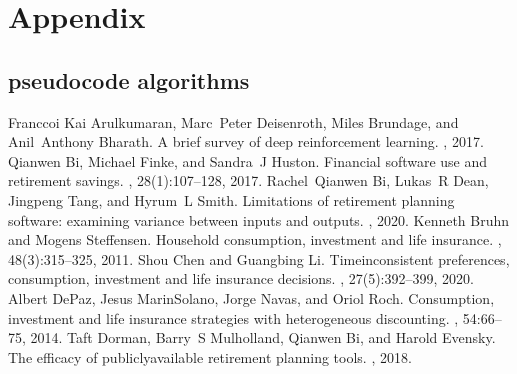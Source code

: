 \documentclass[letterpaper,10pt,english]{jupyterBook}
\begin{document}
\section{Appendix}
\label{\detokenize{Appendix:appendix}}\label{\detokenize{Appendix::doc}}

\subsection{pseudocode algorithms}
\label{\detokenize{Appendix:pseudocode-algorithms}}
\sphinxAtStartPar
{}

\sphinxAtStartPar
{}

\begin{sphinxthebibliography}{Franccoi}
\sphinxAtStartPar
Kai Arulkumaran, Marc Peter Deisenroth, Miles Brundage, and Anil Anthony Bharath. A brief survey of deep reinforcement learning. , 2017.
\sphinxAtStartPar
Qianwen Bi, Michael Finke, and Sandra J Huston. Financial software use and retirement savings. , 28(1):107–128, 2017.
\sphinxAtStartPar
Rachel Qianwen Bi, Lukas R Dean, Jingpeng Tang, and Hyrum L Smith. Limitations of retirement planning software: examining variance between inputs and outputs. , 2020.
\sphinxAtStartPar
Kenneth Bruhn and Mogens Steffensen. Household consumption, investment and life insurance. , 48(3):315–325, 2011.
\sphinxAtStartPar
Shou Chen and Guangbing Li. Time\sphinxhyphen{}inconsistent preferences, consumption, investment and life insurance decisions. , 27(5):392–399, 2020.
\sphinxAtStartPar
Albert De\sphinxhyphen{}Paz, Jesus Marin\sphinxhyphen{}Solano, Jorge Navas, and Oriol Roch. Consumption, investment and life insurance strategies with heterogeneous discounting. , 54:66–75, 2014.
\sphinxAtStartPar
Taft Dorman, Barry S Mulholland, Qianwen Bi, and Harold Evensky. The efficacy of publicly\sphinxhyphen{}available retirement planning tools. , 2018.

\end{sphinxthebibliography}
\end{document}
